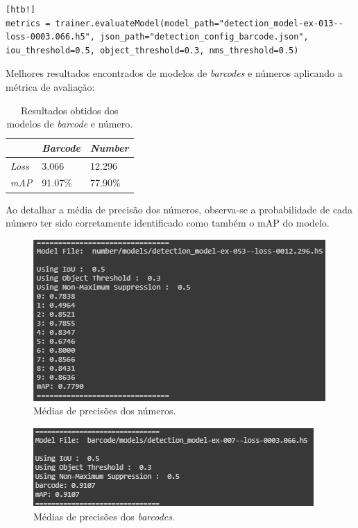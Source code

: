 \begin{lstlisting}[caption=Métricas de saída do modelo, label=cod:metrics][htb!]
metrics = trainer.evaluateModel(model_path="detection_model-ex-013--loss-0003.066.h5", json_path="detection_config_barcode.json", iou_threshold=0.5, object_threshold=0.3, nms_threshold=0.5)
\end{lstlisting}

Melhores resultados encontrados de modelos de \textit{barcodes} e números aplicando a métrica de avaliação:

\begin{table}[H]
	\centering
	\begin{tabular}{|l|l|l|}
		\hline
		\rowcolor[HTML]{ECF4FF} 
		\multicolumn{1}{|c|}{\cellcolor[HTML]{ECF4FF}\textit{Característica}} &
		\multicolumn{1}{|c|}{\cellcolor[HTML]{ECF4FF}\textit{Barcode}} & \multicolumn{1}{c|}{\cellcolor[HTML]{ECF4FF}\textit{Number}}\\ \hline
		\textit{Loss} & 3.066 & 12.296\\ \hline
		\textit{mAP} & 91.07\% & 77.90\%  \\ \hline
	\end{tabular}
	\caption{Resultados obtidos dos modelos de \textit{barcode} e número.}
	\label{tab:Result}
\end{table}

Ao detalhar a média de precisão dos números, observa-se a probabilidade de cada número ter sido corretamente identificado como também o mAP do modelo.


\begin{figure}[H]
	\centering
	\includegraphics[width=0.7\linewidth]{figuras/MachineLearning/numberTrained.png}
	\caption{Médias de precisões dos números.}
	\label{fig:numberTrained}
\end{figure}

\begin{figure}[H]
	\centering
	\includegraphics[width=0.7\linewidth]{figuras/MachineLearning/barcodeTrained.png}
	\caption{Médias de precisões dos \textit{barcodes}.}
	\label{fig:barcodeTrained}
\end{figure}


